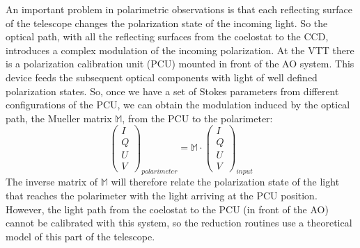 An important problem in polarimetric observations is that each reflecting surface of the telescope changes the polarization state of the incoming light. So the optical path, with all the reflecting surfaces from the coelostat to the CCD, introduces a complex modulation of the incoming polarization. At the VTT there is a polarization calibration unit (PCU) mounted in front of the AO system. This device feeds the subsequent optical components with light of well defined polarization states.  So, once we have a set of Stokes parameters from different configurations of the PCU, we can obtain the modulation induced by the optical path, the Mueller matrix $ \mathbb{M}$,  from the PCU to the polarimeter:
\begin{equation}
\left(\begin{array}{c}I \\Q \\U\\V\end{array}\right)_{polarimeter} = \mathbb{M} \cdot \left(\begin{array}{c}I \\Q \\U\\V\end{array}\right)_{input}
\end{equation}
The inverse  matrix of $\mathbb{M}$ will therefore relate the polarization state of the light that reaches the polarimeter with the light arriving at the PCU position. However, the light path from the coelostat to the PCU (in front of the AO) cannot be calibrated with this system, so the reduction routines use a theoretical model of this part of the telescope.


